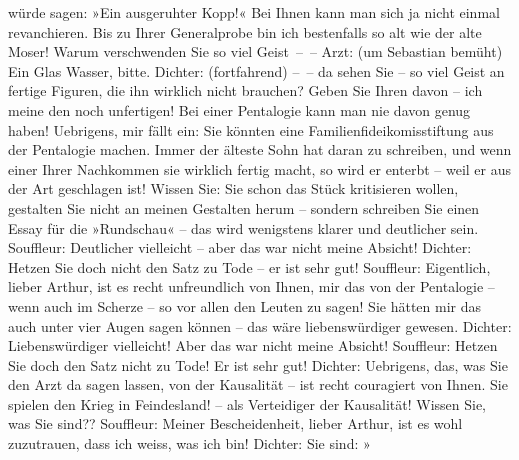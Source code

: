 \begin{ledgroupsized}[t]{13cm}
               würde sagen: »Ein ausgeruhter Kopp!« Bei Ihnen kann man sich ja nicht einmal
               revanchieren. Bis zu Ihrer Generalprobe bin ich bestenfalls so alt wie der alte
               Moser! Warum verschwenden Sie so viel Geist – –\pend
           \pstart
           Arzt: (um Sebastian bemüht) Ein Glas Wasser, bitte.\pend
           \pstart
           Dichter: (fortfahrend) – – da sehen Sie – so viel Geist an fertige Figuren, die ihn
               wirklich nicht brauchen? Geben Sie Ihren davon – ich meine den noch unfertigen! Bei
               einer Pentalogie kann man nie davon genug haben! Uebrigens, mir fällt ein: Sie
               könnten eine Familienfideikomisstiftung aus der Pentalogie machen. Immer der älteste Sohn hat daran zu schreiben, und wenn einer
               Ihrer Nachkommen sie wirklich fertig macht, so wird{ }{\pb}er enterbt – weil er aus der Art
               geschlagen ist! Wissen Sie:  Sie schon das Stück
               kritisieren wollen, gestalten Sie nicht an meinen Gestalten herum – sondern schreiben
               Sie einen Essay für die »Rundschau« – das wird
               wenigstens klarer und deutlicher sein.\pend
           \pstart
           Souffleur: Deutlicher vielleicht – aber das war nicht meine Absicht!\pend
           \pstart
           Dichter: Hetzen Sie doch nicht den Satz zu Tode – er ist sehr gut!\pend
           \pstart
           Souffleur: Eigentlich, lieber Arthur, ist es recht unfreundlich von Ihnen, mir das
               von der Pentalogie – wenn auch im Scherze – so vor allen den Leuten zu sagen! Sie
               hätten mir das auch unter vier Augen sagen können – das wäre liebenswürdiger
               gewesen.\pend
           \pstart
           Dichter: Liebenswürdiger vielleicht! Aber das war nicht meine Absicht!\pend
           \pstart
           Souffleur: Hetzen Sie doch den Satz nicht zu Tode! Er ist sehr gut!\pend
           \pstart
           Dichter: Uebrigens, das, was Sie den Arzt da sagen lassen, von der Kausalität – ist
               recht couragiert von Ihnen. Sie spielen den Krieg in Feindesland!  – als Verteidiger der Kausalität! Wissen Sie, was Sie
               sind??\pend
           \pstart
           Souffleur: Meiner Bescheiden\introOben{}heit\introOben{}, lieber Arthur, ist es wohl
               zuzutrauen, dass ich weiss, was ich bin!\pend
           \pstart
           Dichter: Sie sind: »\label{K_L01900-3v}
\end{ledgroupsized}

